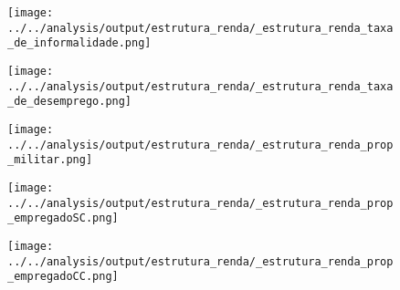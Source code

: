 \begin{frame}[label=_estrutura_renda_taxa_de_informalidade]{}
\textit{\hyperlink{_estrutura_renda}{}}
\begin{figure}
  \centering
  \texttt{[image: ../../analysis/output/estrutura\_renda/\_estrutura\_renda\_taxa\_de\_informalidade.png]}
  \caption{}
  \label{fig:_estrutura_renda_taxa_de_informalidade}
\end{figure}
\end{frame}

\begin{frame}[label=_estrutura_renda_taxa_de_desemprego]{}
\textit{\hyperlink{_estrutura_renda}{}}
\begin{figure}
  \centering
  \texttt{[image: ../../analysis/output/estrutura\_renda/\_estrutura\_renda\_taxa\_de\_desemprego.png]}
  \caption{}
  \label{fig:_estrutura_renda_taxa_de_desemprego}
\end{figure}
\end{frame}

\begin{frame}[label=_estrutura_renda_prop_militar]{}
\textit{\hyperlink{_estrutura_renda}{}}
\begin{figure}
  \centering
  \texttt{[image: ../../analysis/output/estrutura\_renda/\_estrutura\_renda\_prop\_militar.png]}
  \caption{}
  \label{fig:_estrutura_renda_prop_militar}
\end{figure}
\end{frame}


\begin{frame}[label=_estrutura_renda_prop_empregadoSC]{}
\textit{\hyperlink{_estrutura_renda}{}}
\begin{figure}
  \centering
  \texttt{[image: ../../analysis/output/estrutura\_renda/\_estrutura\_renda\_prop\_empregadoSC.png]}
  \caption{}
  \label{fig:_estrutura_renda_prop_empregadoSC}
\end{figure}
\end{frame}

\begin{frame}[label=_estrutura_renda_prop_empregadoCC]{}
\textit{\hyperlink{_estrutura_renda}{}}
\begin{figure}
  \centering
  \texttt{[image: ../../analysis/output/estrutura\_renda/\_estrutura\_renda\_prop\_empregadoCC.png]}
  \caption{}
  \label{fig:_estrutura_renda_prop_empregadoCC}
\end{figure}
\end{frame}

